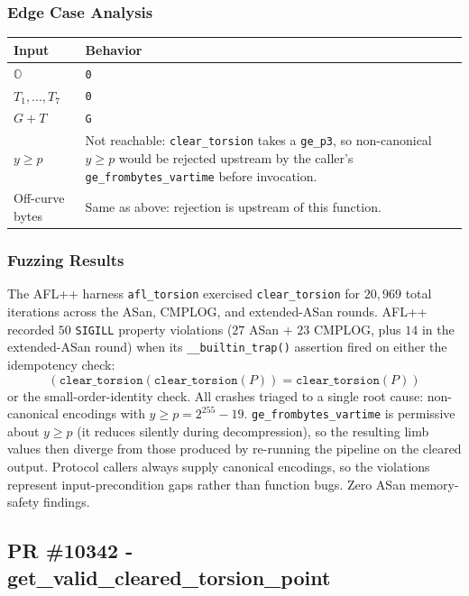 \documentclass[12pt,titlepage,table]{article}
\begin{document}
\subsubsection{Edge Case Analysis}

\begin{table}[htbp]
\centering
{
\begin{tabular}{| p{1.8in} | p{4.3in} |}
\hline
\textbf{Input} & \textbf{Behavior} \\
\hline
\hline
$\mathbb{O}$ & \verb+0+ \\
$T_1,...,T_7$ & \verb+0+ \\
$G+T$ & \verb+G+ \\
$y \geq p$ & Not reachable: \verb+clear_torsion+ takes a \verb+ge_p3+, so non-canonical $y \geq p$ would be rejected upstream by the caller's \verb+ge_frombytes_vartime+ before invocation.\\
Off-curve bytes & Same as above: rejection is upstream of this function.\\
\hline
\end{tabular}}
\end{table}

\subsubsection{Fuzzing Results}
The AFL++ harness \verb+afl_torsion+ exercised \verb+clear_torsion+ for $20{,}969$ total iterations across the ASan, CMPLOG, and extended-ASan rounds.  AFL++ recorded $50$ \verb+SIGILL+ property violations ($27$ ASan + $23$ CMPLOG, plus $14$ in the extended-ASan round) when its \verb+__builtin_trap()+ assertion fired on either the idempotency check:
$$(\texttt{clear\_torsion}(\texttt{clear\_torsion}(P)) = \texttt{clear\_torsion}(P))$$ 
or the small-order-identity check. All crashes triaged to a single root cause: non-canonical encodings with $y \geq p = 2^{255}-19$. \verb+ge_frombytes_vartime+ is permissive about $y \geq p$ (it reduces silently during decompression), so the resulting limb values then diverge from those produced by re-running the pipeline on the cleared output. Protocol callers always supply canonical encodings, so the violations represent input-precondition gaps rather than function bugs.  Zero ASan memory-safety findings.

\newpage
\subsection{PR \#10342 - get\_valid\_cleared\_torsion\_point}
\end{document}
